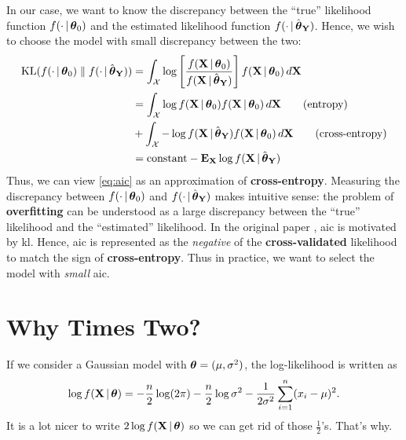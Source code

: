\documentclass[a4paper]{article}
\begin{document}
In our case, we want to know the discrepancy between
the ``true'' likelihood function $f(\cdot\,|\,\boldsymbol{\theta}_{0})$ and
the estimated likelihood function $f(\cdot\,|\,\hat{\boldsymbol{\theta}}_{\mathbf{Y}})$.
Hence, we wish to choose the model with small discrepancy between the two:
\begin{align*}
	\operatorname{KL}(f(\cdot\,|\,\boldsymbol{\theta}_0) \;\|\; f(\cdot\,|\,\hat{\boldsymbol{\theta}}_{\mathbf{Y}}))
	&=
	\int_{\mathcal{X}}
	\log
	\left[
	\frac{f(\mathbf{X}\,|\,\boldsymbol{\theta}_{0})}{f(\mathbf{X}\,|\,\hat{\boldsymbol{\theta}}_{\mathbf{Y}})}
	\right]
	f(\mathbf{X}\,|\,\boldsymbol{\theta}_{0})
	\,d{\mathbf{X}} \\
	&= 
	\int_{\mathcal{X}}
	\log
	f(\mathbf{X}\,|\,\boldsymbol{\theta}_{0})
	f(\mathbf{X}\,|\,\boldsymbol{\theta}_{0})
	\,d{\mathbf{X}}
	\tag{entropy}\\
	&+
	\int_{\mathcal{X}}
	-
	\log
	f(\mathbf{X}\,|\,\hat{\boldsymbol{\theta}}_{\mathbf{Y}})
	f(\mathbf{X}\,|\,\boldsymbol{\theta}_{0})
	\,d{\mathbf{X}}
	\tag{cross-entropy}\\
	&=
	\text{constant}
	- \operatorname{\text{\textrm{\upshape\textbf{E}}}}_{\mathbf{X}} \log f(\mathbf{X}\,|\,\hat{\boldsymbol{\theta}}_{\mathbf{Y}})
\end{align*}
Thus, we can view \eqref{eq:aic} as an approximation of \textbf{cross-entropy}.
Measuring the discrepancy between $f(\cdot\,|\,\boldsymbol{\theta}_{0})$ and $f(\cdot\,|\,\hat{\boldsymbol{\theta}}_{\mathbf{Y}})$ makes intuitive sense:
the problem of \textbf{overfitting} can be understood as a large discrepancy between the ``true'' likelihood and the ``estimated'' likelihood.
In the original paper \parencite{akaike-1974}, \acrshort{aic} is motivated by \acrshort{kl}.
Hence, \acrshort{aic} is represented as the \emph{negative} of the \textbf{cross-validated} likelihood to match the sign of \textbf{cross-entropy}.
Thus in practice, we want to select the model with \emph{small} \acrshort{aic}.

\section{Why Times Two?}

If we consider a Gaussian model with $\boldsymbol{\theta}=(\mu,\sigma^2)$,
the log-likelihood is written as
\begin{align*}
	\log f(\mathbf{X}\,|\, \boldsymbol{\theta})
	=
	- \frac{n}{2} \log(2\pi)
	- \frac{n}{2} \log\sigma^2
	- \frac{1}{2\sigma^2} \sum_{i=1}^{n} (x_{i} - \mu)^2.
\end{align*}
It is a lot nicer to write $2\log f(\mathbf{X}\,|\,\boldsymbol{\theta})$ so we can get rid of those $\frac12$'s.
That's why.
\asDemonstrated

\vfill
\printglossaries
\printbibliography
\end{document}
